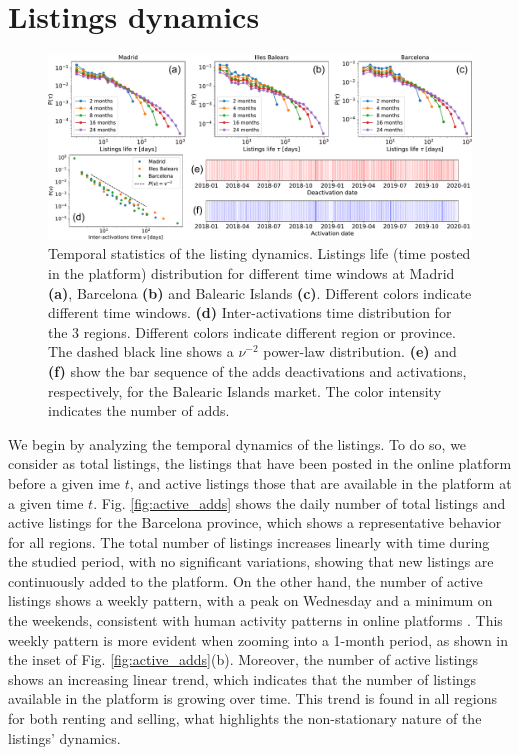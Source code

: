 \section{Listings dynamics}

\begin{figure}
    \centering
    \includegraphics[width =\textwidth]{Figs/Idealista_dynamics/panel_time.pdf}
	\caption[Temporal statistics of the listing dynamics.]{ \label{fig:panel_time} Temporal statistics of the listing dynamics. Listings life (time posted in the platform) distribution for different time windows at Madrid \textbf{(a)}, Barcelona \textbf{(b)} and Balearic Islands \textbf{(c)}. Different colors indicate different time windows. \textbf{(d)} Inter-activations time distribution for the 3 regions. Different colors indicate different region or province. The dashed black line shows a $\nu^{-2}$ power-law distribution. \textbf{(e)} and \textbf{(f)} show the bar sequence of the adds deactivations and activations, respectively, for the Balearic Islands market. The color intensity indicates the number of adds.}
\end{figure}

We begin by analyzing the temporal dynamics of the listings. To do so, we consider as total listings, the listings that have been posted in the online platform before a given ime $t$, and active listings those that are available in the platform at a given time $t$. Fig. \ref{fig:active_adds} shows the daily number of total listings and active listings for the Barcelona province, which shows a representative behavior for all regions. The total number of listings increases linearly with time during the studied period, with no significant variations, showing that new listings are continuously added to the platform. On the other hand, the number of active listings shows a weekly pattern, with a peak on Wednesday and a minimum on the weekends, consistent with human activity patterns in online platforms \cite{szell2010multirelational}. This weekly pattern is more evident when zooming into a 1-month period, as shown in the inset of Fig. \ref{fig:active_adds}(b). Moreover, the number of active listings shows an increasing linear trend, which indicates that the number of listings available in the platform is growing over time. This trend is found in all regions for both renting and selling, what highlights the non-stationary nature of the listings' dynamics.

